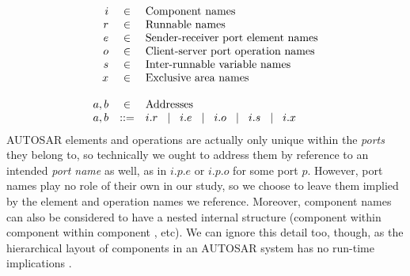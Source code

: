 \documentclass[10pt,conference]{IEEEtran}
\begin{document}
%
\[
\begin{array}{rcll}
  i & \in & \text{Component names} \\
  r & \in & \text{Runnable names} \\
  e & \in & \text{Sender-receiver port element names} \\
  o & \in & \text{Client-server port operation names} \\
  s & \in & \text{Inter-runnable variable names} \\
  x & \in & \text{Exclusive area names} \\
\\
  a,b & \in & \text{Addresses} \\
  a,b & ::= & i.r  \hspace{2ex}|\hspace{2ex}  i.e   \hspace{2ex}|\hspace{2ex} i.o   \hspace{2ex}|\hspace{2ex}   i.s   \hspace{2ex}|\hspace{2ex}   i.x   \\
\end{array}
\]
%
AUTOSAR elements and operations are actually only unique within the {\em ports} they belong to, so technically we ought to address them by reference to an intended {\em port name} as well, as in $i.p.e$ or $i.p.o$ for some port $p$. However, port names play no role of their own in our study, so we choose to leave them implied by the element and operation names we reference. Moreover, component names  can also be considered to have a nested internal structure (component  within component  within component , etc). We can ignore this detail too, though, as the hierarchical layout of components in an AUTOSAR system has no run-time implications \cite[ch.~3.3.1]{AR:SWC}.
\end{document}
